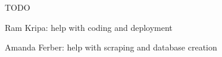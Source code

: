 
TODO

Ram Kripa: help with coding and deployment 

Amanda Ferber: help with scraping and database creation

